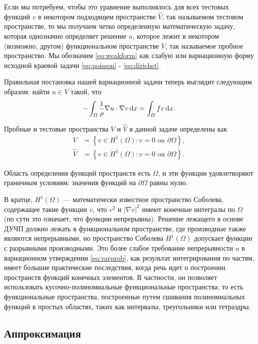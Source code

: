 Если мы потребуем, чтобы это уравнение выполнялось для всех тестовых функций $v$ в некотором подходящем пространстве $\hat V$, так называемом тестовом пространстве, то мы получаем четко определенную математическую задачу, которая однозначно определяет решение $u$, которое лежит в некотором (возможно, другом) функциональном пространстве $V$, так называемое пробное пространство. Мы обозначим \eqref{eq:weakform} как слабую или вариационную форму исходной краевой задачи \eqref{eq:poisson} - \eqref{eq:dirichet}.

Правильная постановка нашей вариационной задачи теперь выглядит следующим образом: найти $u \in V$ такой, что
\begin{equation} \label{eq:varprob}
- \int_\varOmega \frac 1 \rho \nabla u\cdot\nabla v \, \mathrm{d}x = \int_\varOmega f v \, \mathrm{d}x.
\end{equation}

Пробные и тестовые пространства $V$ и $\hat V$ в данной задаче определены как
\begin{align}
V &= \left\{v \in H^{1}(\Omega): v=0 \text { on } \partial \Omega\right\}, \\
\hat{V} &= \left\{v \in H^{1}(\Omega): v=0 \text { on } \partial \Omega\right\}.
\end{align}

Область определения функций пространств есть $\Omega$,
и эти функции удовлетворяют граничным условиям:
значения функций на $\partial\Omega$ равны нулю.

В кратце, $H^1(\Omega)$ --- математически известное пространство Соболева, содержащее такие функции $v$, что $v^2$ и $|\nabla v|^2$ имеют конечные интегралы по $\Omega$ (по сути это означает, что функции непрерывны). Решение лежащего в основе ДУЧП должно лежать в функциональном пространстве, где производные также являются непрерывными, но пространство Соболева $H^1(\Omega)$ допускает функции с разрывными производными. Это более слабое требование непрерывности $u$ в вариационном утверждении \eqref{eq:varprob}, как результат интегрирования по частям, имеет большие практические последствия, когда речь идет о построении пространств функций конечных элементов. В частности, он позволяет использовать кусочно-полиномиальные функциональные пространства; то есть функциональные пространства, построенные путем сшивания полиномиальных функций в простых областях, таких как интервалы, треугольники или тетраэдры.


\subsection{Аппроксимация}

